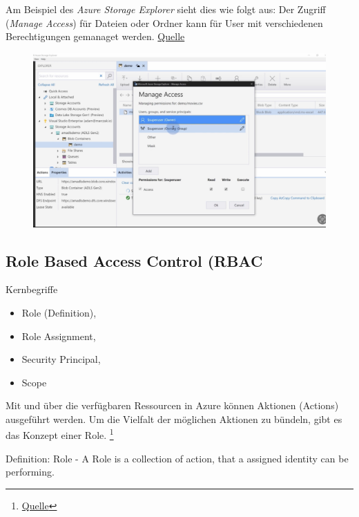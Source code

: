 Am Beispiel des \textit{Azure Storage Explorer} sieht dies wie folgt aus: Der Zugriff (\textit{Manage Access}) für Dateien oder Ordner kann für User mit verschiedenen Berechtigungen gemanaget werden.
	\href{https://learn.microsoft.com/en-us/azure/storage/blobs/data-lake-storage-access-control-model#access-control-lists-acls}{Quelle}

\begin{figure}[H]
	\centering
	\includegraphics[scale = 0.2]{attachment/chapter_2/Scc118}
\end{figure}

\subsection{Role Based Access Control (RBAC}
Kernbegriffe
\begin{itemize}
	\item Role (Definition),
	\item Role Assignment,
	\item Security Principal,
	\item Scope
\end{itemize}

Mit und über die verfügbaren Ressourcen in Azure können Aktionen (Actions) ausgeführt werden. Um die Vielfalt der möglichen Aktionen zu bündeln, gibt es das Konzept einer Role.
\footnote{
	\href{https://youtu.be/4v7ffXxOnwU}{Quelle}
}

\begin{center}
	Definition: Role - A Role is a collection of action, that a assigned identity can be performing.	
\end{center}

